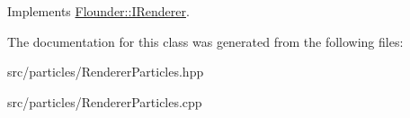 Implements \hyperlink{class_flounder_1_1_i_renderer_a4e86d6621f6f63442e1c07655afd9daa}{Flounder\+::\+I\+Renderer}.



The documentation for this class was generated from the following files\+:\begin{DoxyCompactItemize}
\item 
src/particles/Renderer\+Particles.\+hpp\item 
src/particles/Renderer\+Particles.\+cpp\end{DoxyCompactItemize}

